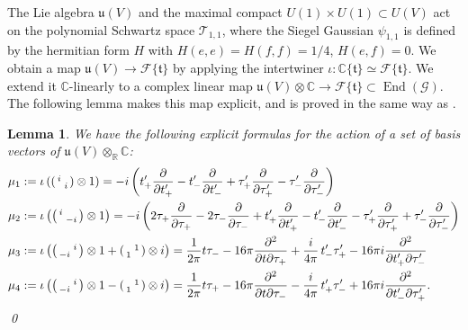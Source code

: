 \documentclass[reqno, 11pt]{amsart} %
\numberwithin{equation}{section}
\theoremstyle{plain}
\newtheorem{lemma}[theorem]{Lemma}
\theoremstyle{definition}
\theoremstyle{remark}
\newcommand{\mbC}{\mathbb{C}}
\newcommand{\mfu}{\mathfrak{u}}
\newcommand{\bbC}{\mathbb C}
\newcommand{\bbR}{\mathbb R}
\newcommand{\calF}{\mathcal F}
\newcommand{\lie}[1]{ \mathfrak{#1}}
\DeclareMathOperator{\End}{End}
\begin{document}
The Lie algebra $\mfu(V)$ and the maximal compact $U(1)\times U(1)\subset U(V)$ act on the polynomial Schwartz space $\mathcal T_{1,1}$, where the Siegel Gaussian $ψ_{1,1}$ is defined by the hermitian form $H$ with $H(e,e) = H(f,f) = 1/4$, $H(e,f) = 0$. We obtain a map $\lie{u}(V) \to \calF\{ \lie t  \} $ by applying the intertwiner $\iota \colon  \bbC\{ \lie t \} \simeq \calF\{ \lie t\} $. We extend it $\mbC$-linearly to a complex linear map $\lie{u}(V) \otimes \bbC \to \calF\{ \lie t  \} \subset \End(\mathcal G)$. The following lemma makes this map explicit, and is proved in the same way as .
\begin{lemma}
We have the following explicit formulas for the action of a set of  basis vectors of $\lie{u}(V) \otimes_{\bbR} \bbC$:
\begin{align*}
\mu_1 &:= \iota \left(  \begin{psmallmatrix}
i & \\ & i  \end{psmallmatrix} \otimes 1 \right) =  -i \left( t'_+ \frac{\partial}{\partial t'_+} - t'_- \frac{\partial}{\partial t'_-} + \tau'_+ \frac{\partial}{\partial \tau'_+} - \tau'_- \frac{\partial}{\partial \tau'_-}  \right)\\
\mu_2 &:= \iota \left( \begin{psmallmatrix} i & \\ & -i \end{psmallmatrix} \otimes1 \right)   = -i \left( 2 \tau_+ \frac{\partial}{\partial \tau_+} - 2 \tau_- \frac{\partial}{\partial  \tau_-}  +  t'_+ \frac{\partial}{\partial t'_+} - t'_- \frac{\partial}{\partial t'_-} - \tau'_+ \frac{\partial}{\partial \tau'_+} + \tau'_- \frac{\partial}{\partial \tau'_-}  \right) \\
\mu_3 &:= \iota \left(  \begin{psmallmatrix} & i \\ -i & \end{psmallmatrix} \otimes 1 + \begin{psmallmatrix} & 1 \\ 1 & \end{psmallmatrix} \otimes i \right)
=  \frac1{2 \pi }t  \tau_- - 16 \pi \frac{\partial^2}{\partial t \partial \tau_+}   + \frac{i}{4 \pi}\, t'_- \tau'_+ - 16 \pi i \frac{\partial^2}{\partial t'_+ \partial \tau'_- } \\
\mu_4 &:= \iota \left(  \begin{psmallmatrix} & i \\ -i & \end{psmallmatrix} \otimes 1 - \begin{psmallmatrix} & 1 \\ 1 & \end{psmallmatrix} \otimes i \right)
=  \frac1{2 \pi }  t \tau_+ - 16 \pi \frac{\partial^2}{\partial t \partial \tau_-} - \frac{i}{4 \pi }\, t'_+ \tau'_- + 16 \pi i \frac{\partial^2}{\partial t'_- \partial \tau'_+}.
\end{align*}
\qed
\end{lemma}
\end{document}
